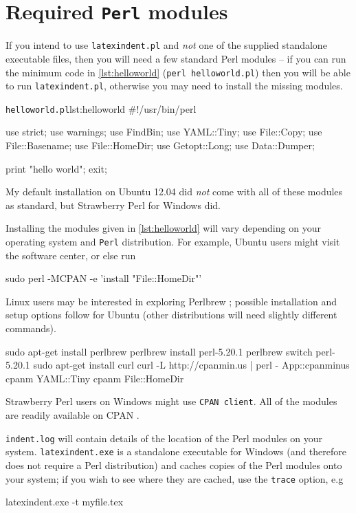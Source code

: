 \appendix
	\section{Required \texttt{Perl} modules}\label{sec:requiredmodules}
	 If you intend to use \texttt{latexindent.pl} and \emph{not} one of the supplied standalone executable files, then you will need a few standard Perl modules -- if you can run the
	 minimum code in \cref{lst:helloworld} (\texttt{perl helloworld.pl}) then you will be able to run \texttt{latexindent.pl}, otherwise you may
	 need to install the missing modules.

	 \begin{cmhlistings}[language=Perl]{\texttt{helloworld.pl}}{lst:helloworld}
	#!/usr/bin/perl

	use strict;
	use warnings;
	use FindBin;
	use YAML::Tiny;
	use File::Copy;
	use File::Basename;
	use File::HomeDir;
	use Getopt::Long;
    use Data::Dumper;

	print "hello world";
	exit;
\end{cmhlistings}
	 My default installation on Ubuntu 12.04 did \emph{not} come
	 with all of these modules as standard, but Strawberry Perl for Windows \cite{strawberryperl}
	 did.

	 Installing the modules given in \cref{lst:helloworld} will vary depending on your
	 operating system and \texttt{Perl} distribution. For example, Ubuntu users
	 might visit the software center, or else run
	 \begin{commandshell}
sudo perl -MCPAN -e 'install "File::HomeDir"'
 \end{commandshell}

	 Linux users may be interested in exploring Perlbrew \cite{perlbrew}; possible installation and setup
	 options follow for Ubuntu (other distributions will need slightly different commands).
	 \begin{commandshell}
sudo apt-get install perlbrew
perlbrew install perl-5.20.1
perlbrew switch perl-5.20.1
sudo apt-get install curl
curl -L http://cpanmin.us | perl - App::cpanminus
cpanm YAML::Tiny
cpanm File::HomeDir
\end{commandshell}

	 Strawberry Perl users on Windows might use
	 \texttt{CPAN client}. All of the modules are readily available on CPAN \cite{cpan}.

	 \texttt{indent.log} will contain details of the location
	 of the Perl modules on your system.  \texttt{latexindent.exe} is a standalone
	 executable for Windows (and therefore does not require a Perl distribution) and caches copies of the Perl modules onto your system; if you
	 wish to see where they are cached, use the  \texttt{trace} option, e.g
	 \begin{dosprompt}
latexindent.exe -t myfile.tex
 \end{dosprompt}

